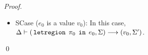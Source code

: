 \begin{proof}
\begin{itemize}
\begin{itemize}
    \item SCase ($e_0$ is a value $v_0$): In this case, $\Delta \vdash (\,{\tt letregion}\,\;\pi_0\;\,{\tt in}\,\;e_0,\Sigma) \longrightarrow (v_0,\Sigma')$.

  \end{itemize}

\end{itemize}
\qed
\end{proof}

